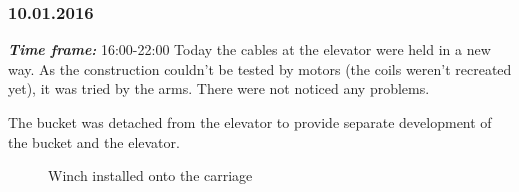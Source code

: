 \subsubsection{10.01.2016}
\textit{\textbf{Time frame:}} 16:00-22:00 \newline
Today the cables at the elevator were held in a new way. As the construction couldn't be tested by motors (the coils weren't recreated yet), it was tried by the arms. There were not noticed any problems.

The bucket was detached from the elevator to provide separate development of the bucket and the elevator.

\begin{figure}[H]
	\begin{minipage}[h]{0.58\linewidth}
		\caption{Winch installed onto the carriage}
	\end{minipage}
	\hfill
	\begin{minipage}[h]{0.37\linewidth}

\end{minipage}
\end{figure}
